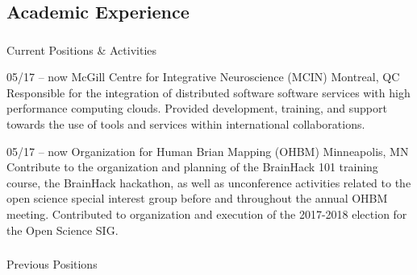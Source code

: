 \documentclass[]{friggeri-cv} %
\begin{document}
\subsection{Academic Experience}

\subsubsection{}{Current Positions \& Activities}

\begin{entrylist}
\entry
{05/17 -- now}
{McGill Centre for Integrative Neuroscience (MCIN)}
{Montreal, QC}
{ \\
Responsible for the integration of distributed software software services with high performance
computing clouds. Provided development, training, and support towards the use of tools and services
within international collaborations.}


\entry
{05/17 -- now}
{Organization for Human Brian Mapping (OHBM)}
{Minneapolis, MN}
{ \\
Contribute to the organization and planning of the BrainHack 101 training course, the BrainHack hackathon,
as well as unconference activities related to the open science special interest group before and throughout
the annual OHBM meeting. Contributed to organization and execution of the 2017-2018 election for the Open
Science SIG.}
\end{entrylist}

\subsubsection{}{Previous Positions}
\end{document}
